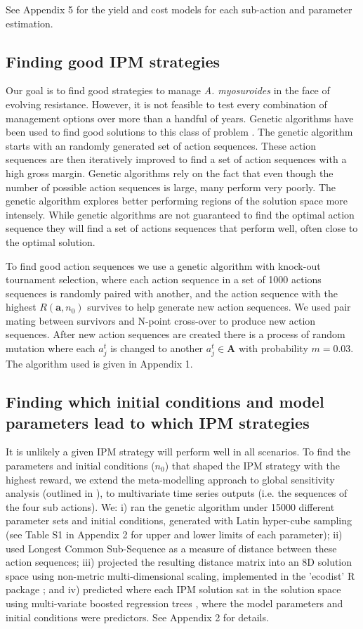 \documentclass[12pt, a4paper]{article}
\begin{document}
See Appendix 5 for the yield and cost models for each sub-action and parameter estimation.

\subsection*{Finding good IPM strategies} 
Our goal is to find good strategies to manage \textit{A. myosuroides} in the face of evolving resistance. However, it is not feasible to test every combination of management options over more than a handful of years. Genetic algorithms have been used to find good solutions to this class of problem \citep{Tayl2004GA, Carr2010}. The genetic algorithm starts with an randomly generated set of action sequences. These action sequences are then iteratively improved to find a set of action sequences with a high gross margin. Genetic algorithms rely on the fact that even though the number of possible action sequences is large, many perform very poorly. The genetic algorithm explores better performing regions of the solution space more intensely. While genetic algorithms are not guaranteed to find the optimal action sequence they will find a set of actions sequences that perform well, often close to the optimal solution.   

To find good action sequences we use a genetic algorithm with knock-out tournament selection, where each action sequence in a set of 1000 actions sequences is randomly paired with another, and the action sequence with the highest $R(\mathbf{a}, n_0)$ survives to help generate new action sequences. We used pair mating between survivors and N-point cross-over to produce new action sequences. After new action sequences are created there is a process of random mutation where each $a_j^t$ is changed to another $a_j^t \in \mathbf{A}$ with probability $m = 0.03$. The algorithm used is given in Appendix 1.        

\subsection*{Finding which initial conditions and model parameters lead to which IPM strategies}
It is unlikely a given IPM strategy will perform well in all scenarios. To find the parameters and initial conditions ($n_0$) that shaped the IPM strategy with the highest reward, we extend the meta-modelling approach to global sensitivity analysis (outlined in \citep{Cout2014}), to multivariate time series outputs (i.e. the sequences of the four sub actions). We: i) ran the genetic algorithm under 15000 different parameter sets and initial conditions, generated with Latin hyper-cube sampling (see Table S1 in Appendix 2 for upper and lower limits of each parameter); ii) used Longest Common Sub-Sequence \citep{Tooh2015} as a measure of distance between these action sequences; iii) projected the resulting distance matrix into an 8D solution space using non-metric multi-dimensional scaling, implemented in the 'ecodist' R package \citep{Gosl2007}; and iv) predicted where each IPM solution sat in the solution space using multi-variate boosted regression trees \citep{Mill2016}, where the model parameters and initial conditions were predictors. See Appendix 2 for details.
\end{document}
